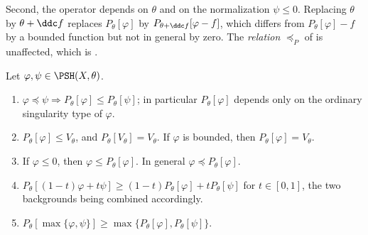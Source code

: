 Second, the operator depends on \(\theta\) and on the normalization
\(\psi\leq0\).  Replacing \(\theta\) by \(\theta+\ddc f\) replaces
\(P_\theta[\varphi]\) by \(P_{\theta+\ddc f}[\varphi-f]\), which differs
from \(P_\theta[\varphi]-f\) by a bounded function but not in general by
zero.  The \emph{relation} \(\preceq_P\) of
 is unaffected, which is
.

\begin{proposition}
\label{prop:ch51-p-elementary}
Let \(\varphi,\psi\in\PSH(X,\theta)\).
\begin{enumerate}
\item\label{itm:ch51-pe:monotone}
      \(\varphi\preceq\psi\Rightarrow
      P_\theta[\varphi]\leq P_\theta[\psi]\); in particular
      \(P_\theta[\varphi]\) depends only on the ordinary singularity type
      of \(\varphi\).
\item\label{itm:ch51-pe:normalize}
      \(P_\theta[\varphi]\leq V_\theta\), and
      \(P_\theta[V_\theta]=V_\theta\).  If \(\varphi\) is bounded, then
      \(P_\theta[\varphi]=V_\theta\).
\item\label{itm:ch51-pe:above}
      If \(\varphi\leq0\), then \(\varphi\leq P_\theta[\varphi]\).  In
      general \(\varphi\preceq P_\theta[\varphi]\).
\item\label{itm:ch51-pe:concave}
      \(P_\theta[(1-t)\varphi+t\psi]\geq
      (1-t)P_\theta[\varphi]+tP_\theta[\psi]\) for \(t\in[0,1]\), the
      two backgrounds being combined accordingly.
\item\label{itm:ch51-pe:max}
      \(P_\theta[\max\{\varphi,\psi\}]
      \geq\max\{P_\theta[\varphi],P_\theta[\psi]\}\).
\end{enumerate}
\end{proposition}

